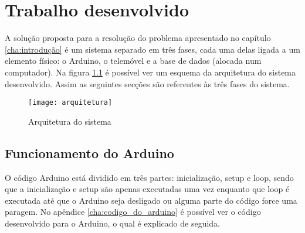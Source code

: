 \chapter{Trabalho desenvolvido}
\label{cha:trabalho desenvolvido}

A solução proposta para a resolução do problema apresentado no capítulo \ref{cha:introdução} é um sistema separado em três fases, cada uma delas ligada a um elemento físico: o Arduino, o telemóvel e a base de dados (alocada num computador). 
Na figura \ref{fig:arquitetura} é possível ver um esquema da arquitetura do sistema desenvolvido.
Assim as seguintes secções são referentes às três fases do sistema.

\begin{figure}[hbtp]
	\centering
	\texttt{[image: arquitetura]}
	\caption{Arquitetura do sistema}
	\label{fig:arquitetura}
\end{figure}

\section{Funcionamento do Arduino}
\label{sec:funcionamento_do_arduino}
O código Arduino está dividido em três partes: inicialização, setup e loop, sendo que a inicialização e setup são apenas executadas uma vez enquanto que loop é executada até que o Arduino seja desligado ou alguma parte do código force uma paragem.
No apêndice \ref{cha:codigo_do_arduino} é possível ver o código desenvolvido para o Arduino, o qual é explicado de seguida.

